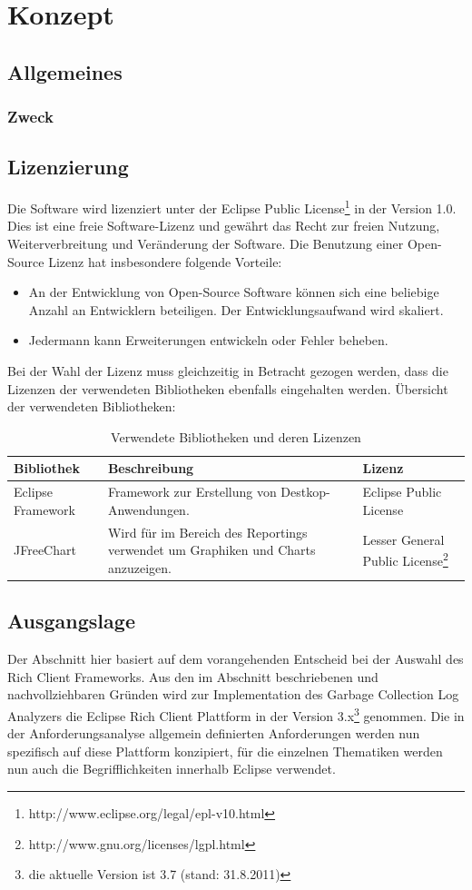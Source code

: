 \chapter{Konzept}
\section{Allgemeines}
\subsection{Zweck}

\section{Lizenzierung}
Die Software wird lizenziert unter der Eclipse Public License\footnote{http://www.eclipse.org/legal/epl-v10.html} in der Version 1.0. Dies ist eine freie Software-Lizenz und gewährt das Recht zur freien Nutzung, Weiterverbreitung und Veränderung der Software. Die Benutzung einer Open-Source Lizenz hat insbesondere folgende Vorteile:
\begin{itemize}
	\item An der Entwicklung von Open-Source Software können sich eine beliebige Anzahl an Entwicklern beteiligen. Der Entwicklungsaufwand wird skaliert.
	\item Jedermann kann Erweiterungen entwickeln oder Fehler beheben.
\end{itemize}

Bei der Wahl der Lizenz muss gleichzeitig in Betracht gezogen werden, dass die Lizenzen der verwendeten Bibliotheken ebenfalls eingehalten werden. Übersicht der verwendeten Bibliotheken:



\begin{longtable}{|p{3cm}|p{7cm}|p{4cm}|}
    \caption{Verwendete Bibliotheken und deren Lizenzen}\\\hline
	\textbf{Bibliothek} & \textbf{Beschreibung}  & \textbf{Lizenz}\\\hline
	Eclipse Framework & Framework zur Erstellung von Destkop-Anwendungen. & Eclipse Public License\\\hline 
	JFreeChart & Wird für im Bereich des Reportings verwendet um Graphiken und Charts anzuzeigen. & Lesser General Public License\footnote{http://www.gnu.org/licenses/lgpl.html}\\\hline
\end{longtable}

\section{Ausgangslage}
Der Abschnitt hier basiert auf dem vorangehenden Entscheid bei der Auswahl des Rich Client Frameworks. Aus den im Abschnitt  beschriebenen und nachvollziehbaren Gründen wird zur Implementation des Garbage Collection Log Analyzers die Eclipse Rich Client Plattform in der Version 3.x\footnote{die aktuelle Version ist 3.7 (stand: 31.8.2011)} genommen. Die in der Anforderungsanalyse allgemein definierten Anforderungen werden nun spezifisch auf diese Plattform konzipiert, für die einzelnen Thematiken werden nun auch die Begrifflichkeiten innerhalb Eclipse verwendet.


